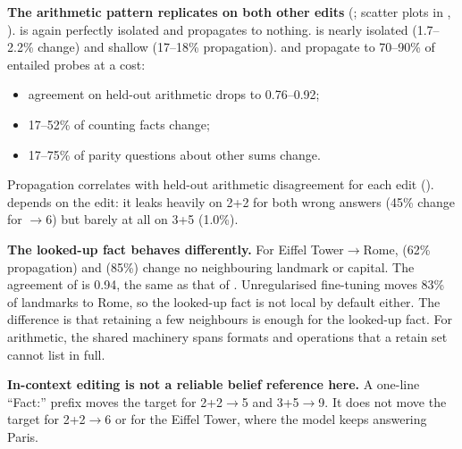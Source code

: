 {\bf The arithmetic pattern replicates on both other edits} (; scatter plots in , ). \cbzero is again perfectly isolated and propagates to nothing. \ftexactr is nearly isolated (1.7--2.2\% \setL change) and shallow (17--18\% propagation). \ftparar and \ftentailr propagate to 70--90\% of entailed probes at a cost:
\begin{itemize}[leftmargin=*,itemsep=0pt,topsep=0pt]
    \item agreement on held-out arithmetic drops to 0.76--0.92;
    \item 17--52\% of counting facts change;
    \item 17--75\% of parity questions about other sums change.
\end{itemize}
Propagation correlates with held-out arithmetic disagreement for each edit (). \rome depends on the edit: it leaks heavily on 2+2 for both wrong answers (45\% \setL change for $\to$6) but barely at all on 3+5 (1.0\%).

{\bf The looked-up fact behaves differently.} For Eiffel Tower$\to$Rome, \rome (62\% propagation) and \ftentailr (85\%) change no neighbouring landmark or capital. The \counterfact agreement of \ftentailr is 0.94, the same as that of \ftcontrol. Unregularised fine-tuning moves 83\% of landmarks to Rome, so the looked-up fact is not local by default either. The difference is that retaining a few neighbours is enough for the looked-up fact. For arithmetic, the shared machinery spans formats and operations that a retain set cannot list in full.

{\bf In-context editing is not a reliable belief reference here.} A one-line ``Fact:'' prefix moves the target for 2+2$\to$5 and 3+5$\to$9. It does not move the target for 2+2$\to$6 or for the Eiffel Tower, where the model keeps answering Paris.
